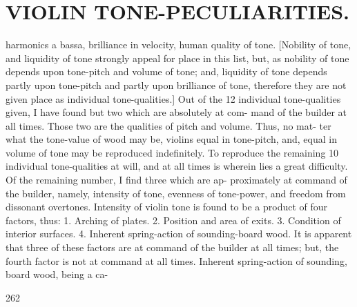 \documentclass{article}
\begin{document}
\section*{VIOLIN TONE-PECULIARITIES.}
harmonics a bassa, brilliance in velocity, human quality of tone. [Nobility of tone, and liquidity of tone strongly appeal for place in this list, but, as nobility of tone depends upon tone-pitch and volume of tone; and, liquidity of tone depends partly upon tone-pitch and partly upon brilliance of tone, therefore they are not given place as individual tone-qualities.] Out of the 12 individual tone-qualities given, I have found but two which are absolutely at com- mand of the builder at all times. Those two are the qualities of pitch and volume. Thus, no mat- ter what the tone-value of wood may be, violins equal in tone-pitch, and, equal in volume of tone may be reproduced indefinitely. To reproduce the remaining 10 individual tone-qualities at will, and at all times is wherein lies a great difficulty. Of the remaining number, I find three which are ap- proximately at command of the builder, namely, intensity of tone, evenness of tone-power, and freedom from dissonant overtones. Intensity of violin tone is found to be a product of four factors, thus: 1. Arching of plates. 2. Position and area of exits. 3. Condition of interior surfaces. 4. Inherent spring-action of sounding-board wood. It is apparent that three of these factors are at command of the builder at all times; but, the fourth factor is not at command at all times. Inherent spring-action of sounding, board wood, being a ca-

262
\end{document}
